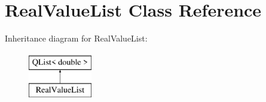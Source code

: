 \hypertarget{class_real_value_list}{}\section{Real\+Value\+List Class Reference}
\label{class_real_value_list}
Inheritance diagram for Real\+Value\+List\+:\begin{figure}[H]
\begin{center}
\leavevmode
\includegraphics[height=2.000000cm]{class_real_value_list}
\end{center}
\end{figure}
